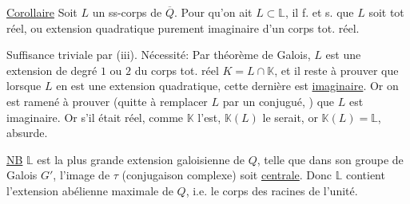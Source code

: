 \uline{Corollaire} Soit $L$ un ss-corps de $\overline Q$. Pour qu'on ait $L\subset\mathbb L$, il f. et s. que $L$ soit tot réel, ou extension quadratique purement imaginaire d'un corps tot. réel.

Suffisance triviale par (iii). Nécessité: Par théorème de Galois, $L$ est une extension de degré $1$ ou $2$ du corps tot. réel $K=L\cap\mathbb K$, et il reste à prouver que lorsque $L$ en est une extension quadratique, cette dernière est  \uline{imaginaire}.
 Or  on est ramené à prouver
(quitte à remplacer $L$ par un conjugué, ) que $L$ est imaginaire. Or s'il était réel, comme $\mathbb K$ l'est, $\mathbb K(L)$ le serait, or $\mathbb K(L)=\mathbb L$, absurde.

\uline{NB} $\mathbb L$ est la plus grande extension galoisienne de $Q$, telle que dans son groupe de Galois $G'$, l'image de $\tau$ (conjugaison complexe) soit \uline{centrale}. Donc $\mathbb L$ contient l'extension abélienne maximale de $Q$, i.e. le corps des racines de l'unité.
